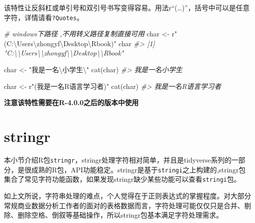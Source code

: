 \documentclass[
]{book}
\newenvironment{Shaded}{\begin{snugshade}}{\end{snugshade}}
\newcommand{\CommentTok}[1]{\textcolor[rgb]{0.56,0.35,0.01}{\textit{#1}}}
\newcommand{\FunctionTok}[1]{\textcolor[rgb]{0.00,0.00,0.00}{#1}}
\newcommand{\NormalTok}[1]{#1}
\newcommand{\OtherTok}[1]{\textcolor[rgb]{0.56,0.35,0.01}{#1}}
\newcommand{\SpecialCharTok}[1]{\textcolor[rgb]{0.00,0.00,0.00}{#1}}
\newcommand{\StringTok}[1]{\textcolor[rgb]{0.31,0.60,0.02}{#1}}
\begin{document}
该特性让反斜杠或单引号和双引号书写变得容易。用法r``(\ldots)''，括号中可以是任意字符，详情请看\texttt{?Quotes}。

\begin{Shaded}
\begin{Highlighting}[]
\CommentTok{\# windows下路径 ,不用转义路径复制直接可用}
\NormalTok{char }\OtherTok{\textless{}{-}}\NormalTok{ r}\StringTok{"(C:\textbackslash{}Users\textbackslash{}zhongyf\textbackslash{}Desktop\textbackslash{}Rbook)"} 
\NormalTok{char}
\CommentTok{\#\textgreater{} [1] "C:\textbackslash{}\textbackslash{}Users\textbackslash{}\textbackslash{}zhongyf\textbackslash{}\textbackslash{}Desktop\textbackslash{}\textbackslash{}Rbook"}
\end{Highlighting}
\end{Shaded}

\begin{Shaded}
\begin{Highlighting}[]
\NormalTok{char }\OtherTok{\textless{}{-}} \StringTok{"我是一名}\SpecialCharTok{\textbackslash{}\textquotesingle{}}\StringTok{小学生}\SpecialCharTok{\textbackslash{}\textquotesingle{}}\StringTok{"} 
\FunctionTok{cat}\NormalTok{(char)}
\CommentTok{\#\textgreater{} 我是一名\textquotesingle{}小学生\textquotesingle{}}

\NormalTok{char }\OtherTok{\textless{}{-}}\NormalTok{ r}\StringTok{"(我是一名\textquotesingle{}R语言\textquotesingle{}学习者)"}
\FunctionTok{cat}\NormalTok{(char)}
\CommentTok{\#\textgreater{} 我是一名\textquotesingle{}R语言\textquotesingle{}学习者}
\end{Highlighting}
\end{Shaded}

\textbf{注意该特性需要在R-4.0.0之后的版本中使用}

\hypertarget{character:stringr-packages}{%
\section{stringr}\label{character:stringr-packages}}

本小节介绍R包\texttt{stringr}，stringr处理字符相对简单，并且是tidyverse系列的一部分，是很成熟的R包，API功能稳定。stringr是基于\texttt{stringi}之上构建的,stringr包集合了常见字符功能函数，如果发现stringr缺少某些功能可以查看\texttt{stringi}包。

如上文所说，字符串处理的难点，个人觉得在于正则表达式的掌握程度。对大部分常规商业数据分析工作者的面对的表格数据而言，字符处理可能仅仅只是合并、剔除、删除空格、倒叙等基础操作，所以stringr包基本满足字符处理需求。
\end{document}
